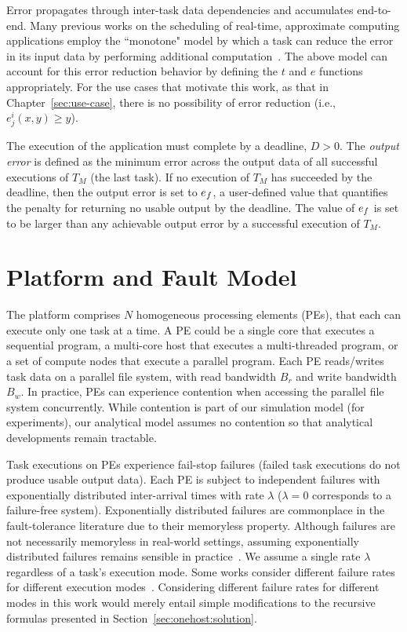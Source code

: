 Error propagates through inter-task data dependencies and
accumulates end-to-end.  Many previous works on the scheduling of
real-time, approximate computing applications employ the ``monotone" model
by which a task can reduce the error in its input data by performing
additional computation~\cite{259428}.  The above model can account for this
error reduction behavior by defining the $t$ and $e$ functions
appropriately.  For the use cases that motivate this work, as that in
Chapter~\ref{sec:use-case}, there is no possibility of error reduction
(i.e., $e^i_j(x,y){\geq}y$).

The execution of the application must complete by a deadline, $D{>}0$. The
\emph{output error} is defined as the minimum error across the output data
of all successful executions of $T_{M}$ (the last task).  If no 
execution of $T_{M}$ has succeeded by the deadline, then the 
output error is set to $e_{f}$, a user-defined value that quantifies
the penalty for returning no usable output by the deadline. The value of
$e_{f}$ is set to be larger than any achievable output error by a successful
execution of $T_M$. 

\section{Platform and Fault Model}
\label{sec:problem-execution}

The platform comprises $N$ homogeneous
processing elements (PEs), that each can execute only one task at a time.
A PE could be a single core that executes a sequential program,
a multi-core host that executes a multi-threaded program, or a set of compute
nodes that execute a parallel program.
Each PE reads/writes task data on a parallel file system,
with read bandwidth $B_r$ and write bandwidth $B_w$. In
practice, PEs can experience contention when accessing the parallel
file system concurrently. While contention is part of our simulation
model (for experiments), our analytical model assumes no
contention so that analytical developments remain tractable.

Task executions on PEs experience fail-stop failures (failed task executions do not produce usable
output data).  Each PE is subject to independent failures with 
exponentially distributed inter-arrival times with 
rate $\lambda$ ($\lambda{=}0$ corresponds to a failure-free system).  
Exponentially distributed failures are commonplace in the fault-tolerance
literature due to their memoryless property. Although failures are not
necessarily memoryless in real-world settings, assuming exponentially
distributed failures remains sensible in practice~\cite{8049007}. We assume
a single rate $\lambda$ regardless of a task's execution mode.  Some works
consider different failure rates for different execution modes~\cite{10.1145/2442087.2442094,10.1007/s11227-021-03764-x,10.1109/TC.2003.1183950}.  Considering different failure
rates for different modes in this work would merely entail simple
modifications to the recursive formulas presented in
Section~\ref{sec:onehost:solution}.

